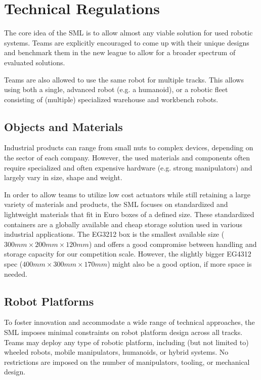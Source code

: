 \documentclass[letterpaper, 11pt]{extarticle}
\begin{document}
\section{Technical Regulations}
\label{s: technical_regs}

The core idea of the SML is to allow almost any viable solution for used robotic systems. Teams are explicitly encouraged to come up with their unique designs and benchmark them in the new league to allow for a broader spectrum of evaluated solutions.

Teams are also allowed to use the same robot for multiple tracks. This allows using both a single, advanced robot (e.g. a humanoid), or a robotic fleet consisting of (multiple) specialized warehouse and workbench robots.

\subsection{Objects and Materials}
Industrial products can range from small nuts to complex devices, depending on the sector of each company.
However, the used materials and components often require specialized and often expensive hardware (e.g. strong manipulators) and largely vary in size, shape and weight. 

In order to allow teams to utilize low cost actuators while still retaining a large variety of materials and products, the SML focuses on standardized and lightweight materials that fit in Euro boxes of a defined size. 
These standardized containers are a globally available and cheap storage solution used in various industrial applications. The EG3212 box is the smallest available size ($300mm\times200mm\times120mm$) and offers a good compromise between handling and storage capacity for our competition scale.
However, the slightly bigger EG4312 spec ($400mm\times300mm\times170mm$) might also be a good option, if more space is needed.

\subsection{Robot Platforms}
To foster innovation and accommodate a wide range of technical approaches, the SML imposes minimal constraints on robot platform design across all tracks. Teams may deploy any type of robotic platform, including (but not limited to) wheeled robots, mobile manipulators, humanoids, or hybrid systems. No restrictions are imposed on the number of manipulators, tooling, or mechanical design.
\end{document}
